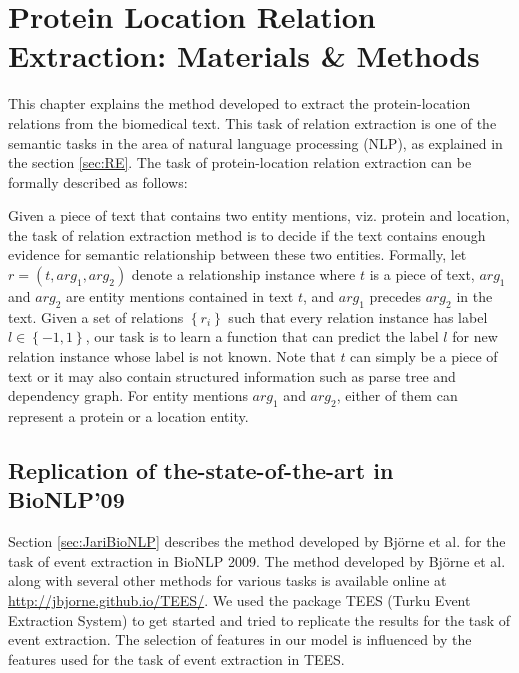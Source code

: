 \chapter{Protein Location Relation Extraction: Materials \& Methods}\label{chapter:methods}
\newcommand*{\xml}[1]{\texttt{<#1>}}

This chapter explains the method developed to extract the protein-location relations from the biomedical text. This task of relation extraction is one of the semantic tasks in the area of natural language processing (NLP), as explained in the section \ref{sec:RE}. The task of protein-location relation extraction can be formally described as follows:

Given a piece of text that contains two entity mentions, viz. protein and location, the task of relation extraction method is to decide if the text contains enough evidence for semantic relationship between these two entities. Formally, let $r=(t,arg_1,arg_2)$ denote a relationship instance where $t$ is a piece of text, $arg_1$ and $arg_2$  are entity mentions contained in text $t$, and $arg_1$ precedes $arg_2$ in the text. Given a set of relations $\left\lbrace r_i \right\rbrace$ such that every relation instance has label $l \in \left\lbrace-1,1\right\rbrace$, our task is to learn a function that can predict the label $l$ for new relation instance whose label is not known. Note that $t$ can simply be a piece of text or it may also contain structured information such as parse tree and dependency graph. For entity mentions $arg_1$ and $arg_2$, either of them can represent a protein or a location entity.
 
\section{Replication of the-state-of-the-art in BioNLP'09}

Section \ref{sec:JariBioNLP} describes the method developed by Björne et al. \cite{bjorne2009extracting} for the task of event extraction in BioNLP 2009. The method developed by Björne et al. along with several other methods for various tasks is available online at \url{http://jbjorne.github.io/TEES/}. We used the package TEES (Turku Event Extraction System) \cite{teesonline} to get started and tried to replicate the results for the task of event extraction. The selection of features in our model is influenced by the features used for the task of event extraction in TEES.

